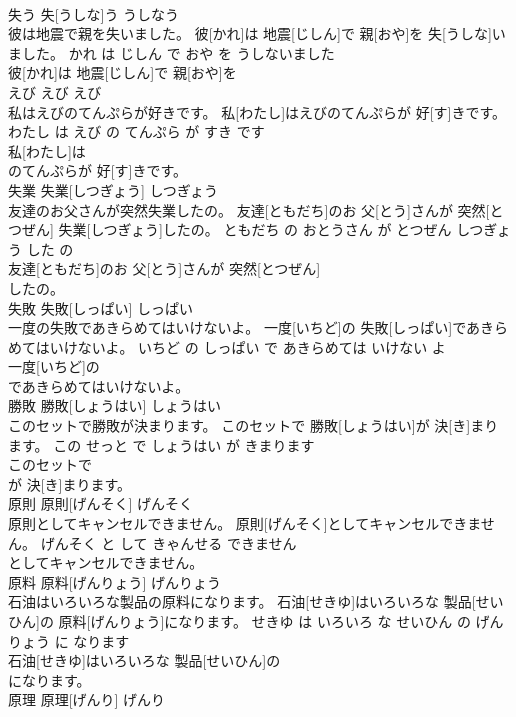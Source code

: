\documentclass[8pt]{extreport}
\begin{document}
\begin{CJK}{UTF8}{min}
\\	失う	失[うしな]う	うしなう	
\\	彼は地震で親を失いました。	彼[かれ]は 地震[じしん]で 親[おや]を 失[うしな]いました。	かれ は じしん で おや を うしないました	
\\	彼[かれ]は 地震[じしん]で 親[おや]を
\\	えび	えび	えび	
\\	私はえびのてんぷらが好きです。	私[わたし]はえびのてんぷらが 好[す]きです。	わたし は えび の てんぷら が すき です	
\\	私[わたし]は
\\	のてんぷらが 好[す]きです。			
\\	失業	失業[しつぎょう]	しつぎょう	
\\	友達のお父さんが突然失業したの。	友達[ともだち]のお 父[とう]さんが 突然[とつぜん] 失業[しつぎょう]したの。	ともだち の おとうさん が とつぜん しつぎょう した の	
\\	友達[ともだち]のお 父[とう]さんが 突然[とつぜん]
\\	したの。			
\\	失敗	失敗[しっぱい]	しっぱい	
\\	一度の失敗であきらめてはいけないよ。	一度[いちど]の 失敗[しっぱい]であきらめてはいけないよ。	いちど の しっぱい で あきらめては いけない よ	
\\	一度[いちど]の
\\	であきらめてはいけないよ。			
\\	勝敗	勝敗[しょうはい]	しょうはい	
\\	このセットで勝敗が決まります。	このセットで 勝敗[しょうはい]が 決[き]まります。	この せっと で しょうはい が きまります	
\\	このセットで
\\	が 決[き]まります。			
\\	原則	原則[げんそく]	げんそく	
\\	原則としてキャンセルできません。	原則[げんそく]としてキャンセルできません。	げんそく と して きゃんせる できません	
\\	としてキャンセルできません。			
\\	原料	原料[げんりょう]	げんりょう	
\\	石油はいろいろな製品の原料になります。	石油[せきゆ]はいろいろな 製品[せいひん]の 原料[げんりょう]になります。	せきゆ は いろいろ な せいひん の げんりょう に なります	
\\	石油[せきゆ]はいろいろな 製品[せいひん]の
\\	になります。			
\\	原理	原理[げんり]	げんり	

\end{CJK}
\end{document}
